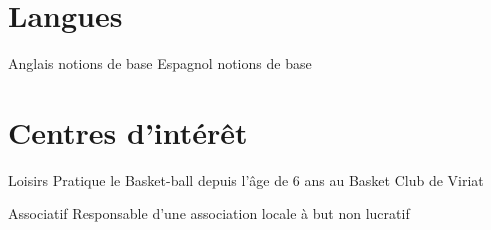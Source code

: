 \documentclass[10pt,a4paper]{moderncv}
\begin{document}

\section{Langues}

\cvcomputer
	{Anglais}
	{notions de base}
	{Espagnol}
	{notions de base}



\section{Centres d'intérêt}

\cvline
	{Loisirs}
	{Pratique le Basket-ball depuis l'âge de 6 ans au Basket Club de Viriat}

\cvline
	{Associatif}
	{Responsable d'une association locale à but non lucratif}

\end{document}
